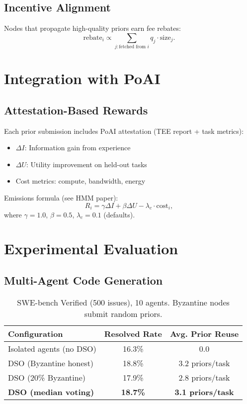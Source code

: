 \documentclass[11pt]{article}
\begin{document}
\subsection{Incentive Alignment}
Nodes that propagate high-quality priors earn fee rebates:
\begin{equation}
\text{rebate}_i \propto \sum_{j: \text{fetched from } i} q_j \cdot \text{size}_j.
\end{equation}

\section{Integration with PoAI}
\subsection{Attestation-Based Rewards}
Each prior submission includes PoAI attestation (TEE report + task metrics):
\begin{itemize}[leftmargin=1.1em]
  \item \(\Delta I\): Information gain from experience
  \item \(\Delta U\): Utility improvement on held-out tasks
  \item Cost metrics: compute, bandwidth, energy
\end{itemize}

Emissions formula (see HMM paper):
\begin{equation}
R_i = \gamma \Delta I + \beta \Delta U - \lambda_c \cdot \text{cost}_i,
\end{equation}
where \(\gamma = 1.0\), \(\beta = 0.5\), \(\lambda_c = 0.1\) (defaults).

\section{Experimental Evaluation}
\subsection{Multi-Agent Code Generation}
\begin{table}[h]
\centering
\begin{tabular}{lcc}
\toprule
Configuration & Resolved Rate & Avg. Prior Reuse \\
\midrule
Isolated agents (no DSO) & 16.3\% & 0.0 \\
DSO (Byzantine honest) & 18.8\% & 3.2 priors/task \\
DSO (20\% Byzantine) & 17.9\% & 2.8 priors/task \\
\textbf{DSO (median voting)} & \textbf{18.7\%} & \textbf{3.1 priors/task} \\
\bottomrule
\end{tabular}
\caption{SWE-bench Verified (500 issues), 10 agents. Byzantine nodes submit random priors.}
\end{table}
\end{document}
